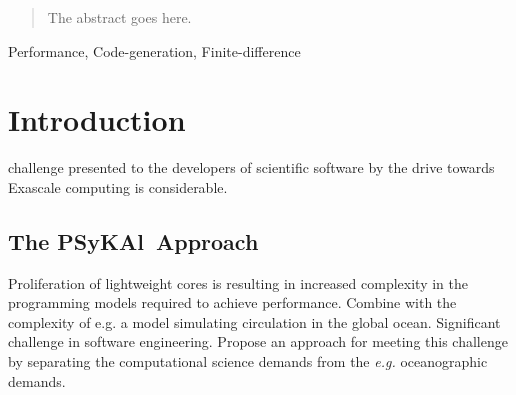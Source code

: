 \documentclass[journal]{IEEEtran}
\newcommand{\psykal}{{PS}y{KA}l\ }
\begin{document}

\maketitle

\begin{abstract}
The abstract goes here.
\end{abstract}

\begin{IEEEkeywords}
Performance, Code-generation, Finite-difference
\end{IEEEkeywords}



%
\IEEEpeerreviewmaketitle


\section{Introduction}
% 
% 
% 
% 
 challenge presented to the developers of
scientific software by the drive towards Exascale computing is
considerable.


\subsection{The \psykal Approach}
Proliferation of lightweight cores is resulting in increased
complexity in the programming models required to achieve performance.
Combine with the complexity of e.g. a model simulating circulation in
the global ocean. Significant challenge in software engineering.
Propose an approach for meeting this challenge by separating the
computational science demands from the {\it e.g.} oceanographic
demands.
\end{document}
